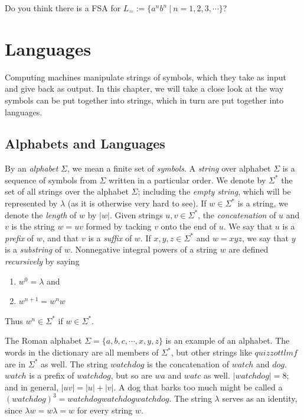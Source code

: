 \documentclass{article}
\begin{document}
Do you think there is a FSA for $L_= := \{ a^n b^n\ |\ n = 1,2,3,\cdots \}$?




\newpage

\section{Languages}


Computing machines manipulate strings of symbols, which they take as input and give back as output. In this chapter, we will take a close look at the way symbols can be put together into strings, which in turn are put together into languages. 


\subsection{Alphabets and Languages} %

By an \emph{alphabet} $\Sigma$, we mean a finite set of \emph{symbols}. A \emph{string} over alphabet $\Sigma$ is a sequence of symbols from $\Sigma$ written in a particular order. We denote by $\Sigma^*$ the set of all strings over the alphabet $\Sigma$; including the \emph{empty string}, which will be represented by $\lambda$ (as it is otherwise very hard to see). If $w \in \Sigma^*$ is a string, we denote the \emph{length} of $w$ by $|w|$. Given strings $u,v \in \Sigma^*$, the \emph{concatenation} of $u$ and $v$ is the string $w = uv$ formed by tacking $v$ onto the end of $u$. We say that $u$ is a \emph{prefix} of $w$, and that $v$ is a \emph{suffix} of $w$. If $x,y,z \in \Sigma^*$ and $w = xyz$, we say that $y$ is a \emph{substring} of $w$. Nonnegative integral powers of a string $w$ are defined \emph{recursively} by saying
\begin{enumerate}
  \item $w^0 = \lambda$ and
  \item $w^{n+1} = w^nw$
\end{enumerate}
Thus $w^n \in \Sigma^*$ if $w \in \Sigma^*$.

The Roman alphabet $\Sigma = \{ a,b,c,\cdots,x,y,z \}$ is an example of an alphabet. The words in the dictionary are all members of $\Sigma^*$, but other strings like $quizzottlmf$ are in $\Sigma^*$ as well. The string $watchdog$ is the concatenation of $watch$ and $dog$. $watch$ is a prefix of $watchdog$, but so are $wa$ and $watc$ as well. $|watchdog| = 8$; and in general, $|uv| = |u| + |v|$. A dog that barks too much might be called a $(watchdog)^3 = watchdogwatchdogwatchdog$. The string $\lambda$ serves as an identity, since $\lambda w = w \lambda = w$ for every string $w$.
\end{document}
